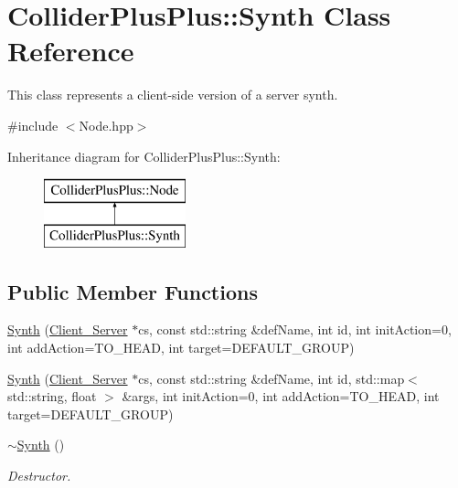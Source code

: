 \hypertarget{classColliderPlusPlus_1_1Synth}{\section{Collider\-Plus\-Plus\-:\-:Synth Class Reference}
\label{classColliderPlusPlus_1_1Synth}
}


This class represents a client-\/side version of a server synth.  




{\ttfamily \#include $<$Node.\-hpp$>$}

Inheritance diagram for Collider\-Plus\-Plus\-:\-:Synth\-:\begin{figure}[H]
\begin{center}
\leavevmode
\includegraphics[height=2.000000cm]{classColliderPlusPlus_1_1Synth}
\end{center}
\end{figure}
\subsection*{Public Member Functions}
\begin{DoxyCompactItemize}
\item 
\hyperlink{classColliderPlusPlus_1_1Synth_a5c95bece3a757b2c29d642b05d30ea6e}{Synth} (\hyperlink{classColliderPlusPlus_1_1Client__Server}{Client\-\_\-\-Server} $\ast$cs, const std\-::string \&def\-Name, int id, int init\-Action=0, int add\-Action=T\-O\-\_\-\-H\-E\-A\-D, int target=D\-E\-F\-A\-U\-L\-T\-\_\-\-G\-R\-O\-U\-P)
\item 
\hyperlink{classColliderPlusPlus_1_1Synth_a67622c2388d4d329f4d1ec99693c1d3a}{Synth} (\hyperlink{classColliderPlusPlus_1_1Client__Server}{Client\-\_\-\-Server} $\ast$cs, const std\-::string \&def\-Name, int id, std\-::map$<$ std\-::string, float $>$ \&args, int init\-Action=0, int add\-Action=T\-O\-\_\-\-H\-E\-A\-D, int target=D\-E\-F\-A\-U\-L\-T\-\_\-\-G\-R\-O\-U\-P)
\item 
\hypertarget{classColliderPlusPlus_1_1Synth_a1fb61bf548db414b4dc543eac83216ae}{\hyperlink{classColliderPlusPlus_1_1Synth_a1fb61bf548db414b4dc543eac83216ae}{$\sim$\-Synth} ()}\label{classColliderPlusPlus_1_1Synth_a1fb61bf548db414b4dc543eac83216ae}

\begin{DoxyCompactList}\small\item\em Destructor. \end{DoxyCompactList}\end{DoxyCompactItemize}


